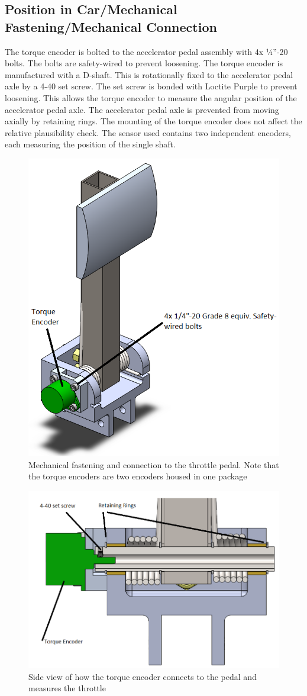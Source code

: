 \documentclass{article}
\begin{document}
    \subsection{Position in Car/Mechanical Fastening/Mechanical Connection}

        
        The torque encoder is bolted to the accelerator pedal assembly with 4x ¼”-20 bolts. The bolts are safety-wired to prevent loosening. The torque encoder is manufactured with a D-shaft. This is rotationally fixed to the accelerator pedal axle by a 4-40 set screw. The set screw is bonded with Loctite Purple to prevent loosening. This allows the torque encoder to measure the angular position of the accelerator pedal axle. The accelerator pedal axle is prevented from moving axially by retaining rings. The mounting of the torque encoder does not affect the relative plausibility check. The sensor used contains two independent encoders, each measuring the position of the single shaft.

        \begin{figure}[H]
            \centering
            \includegraphics[width = 0.5 \textwidth]{torqueencoder}
            \caption{Mechanical fastening and connection to the throttle pedal. Note that the torque encoders are two encoders housed in one package}
            \label{torquefront}
        \end{figure}
        
        \begin{figure}[H]
            \centering
            \includegraphics[width = 0.7 \textwidth]{torqueside}
            \caption{Side view of how the torque encoder connects to the pedal and measures the throttle}
            \label{torqside}
        \end{figure}
        
\end{document}
